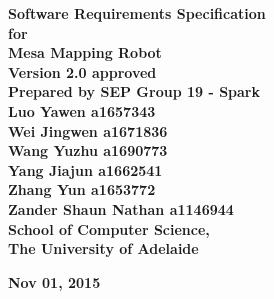 \documentclass[11pt, a4paper]{article}
\begin{document}
\begin{titlepage}

\begin{center}

	\vspace{0.5 cm}
	\fontsize{35}{35}\selectfont\bf {Software Requirements Specification}\\
	\vspace{0.5 cm}
	\huge{\bfseries for}\\
	\vspace{0.5 cm}
	\fontsize{35}{40}\selectfont\bf {Mesa Mapping Robot}\\
	
	\vspace{2cm}
	\Large\textbf{ Version 2.0 approved}\\
	
	\vspace{1.5cm}
	\Large\textbf {Prepared by SEP Group 19 - Spark\\
								Luo Yawen a1657343 \\
								Wei Jingwen a1671836 \\
								Wang Yuzhu a1690773 \\
								Yang Jiajun a1662541\\
								Zhang Yun a1653772 \\
								Zander Shaun Nathan a1146944}\\
		
	\vspace{2cm}
	\Large\textbf{ School of Computer Science,\\
								The University of Adelaide}\\
	\vspace{2cm}
	
	\Large\textbf{Nov 01, 2015}\\

\end{center}

\end{titlepage}

\tableofcontents

\vspace{1cm}
\end{document}
